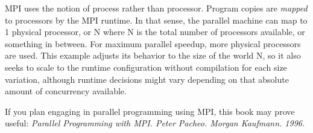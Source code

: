 MPI uses the notion of process rather than processor. Program copies are
\emph{mapped} to processors by the MPI runtime. In that sense, the parallel
machine can map to 1 physical processor, or N where N is the total number of
processors available, or something in between. For maximum parallel speedup,
more physical processors are used. This example adjusts its behavior to the
size of the world N, so it also seeks to scale to the runtime configuration
without compilation for each size variation, although runtime decisions might
vary depending on that absolute amount of concurrency available.


 If you plan engaging in parallel programming using MPI, this
book may prove useful: \emph{Parallel Programming with MPI. Peter Pacheo.
Morgan Kaufmann. 1996.}
